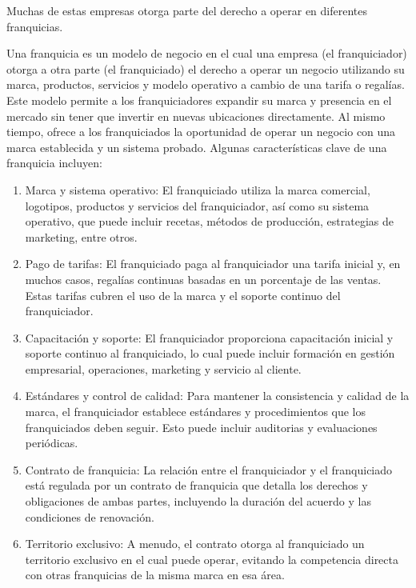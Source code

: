 \documentclass[
  us-letterpaper,
]{scrreprt}
\theoremstyle{plain}
\theoremstyle{plain}
\theoremstyle{definition}
\theoremstyle{remark}
\begin{document}
Muchas de estas empresas otorga parte del derecho a operar en diferentes
franquicias.

Una franquicia es un modelo de negocio en el cual una empresa (el
franquiciador) otorga a otra parte (el franquiciado) el derecho a operar
un negocio utilizando su marca, productos, servicios y modelo operativo
a cambio de una tarifa o regalías. Este modelo permite a los
franquiciadores expandir su marca y presencia en el mercado sin tener
que invertir en nuevas ubicaciones directamente. Al mismo tiempo, ofrece
a los franquiciados la oportunidad de operar un negocio con una marca
establecida y un sistema probado. Algunas características clave de una
franquicia incluyen:

\begin{enumerate}
\def\labelenumi{\arabic{enumi}.}
\item
  Marca y sistema operativo: El franquiciado utiliza la marca comercial,
  logotipos, productos y servicios del franquiciador, así como su
  sistema operativo, que puede incluir recetas, métodos de producción,
  estrategias de marketing, entre otros.
\item
  Pago de tarifas: El franquiciado paga al franquiciador una tarifa
  inicial y, en muchos casos, regalías continuas basadas en un
  porcentaje de las ventas. Estas tarifas cubren el uso de la marca y el
  soporte continuo del franquiciador.
\item
  Capacitación y soporte: El franquiciador proporciona capacitación
  inicial y soporte continuo al franquiciado, lo cual puede incluir
  formación en gestión empresarial, operaciones, marketing y servicio al
  cliente.
\item
  Estándares y control de calidad: Para mantener la consistencia y
  calidad de la marca, el franquiciador establece estándares y
  procedimientos que los franquiciados deben seguir. Esto puede incluir
  auditorias y evaluaciones periódicas.
\item
  Contrato de franquicia: La relación entre el franquiciador y el
  franquiciado está regulada por un contrato de franquicia que detalla
  los derechos y obligaciones de ambas partes, incluyendo la duración
  del acuerdo y las condiciones de renovación.
\item
  Territorio exclusivo: A menudo, el contrato otorga al franquiciado un
  territorio exclusivo en el cual puede operar, evitando la competencia
  directa con otras franquicias de la misma marca en esa área.
\end{enumerate}
\end{document}
